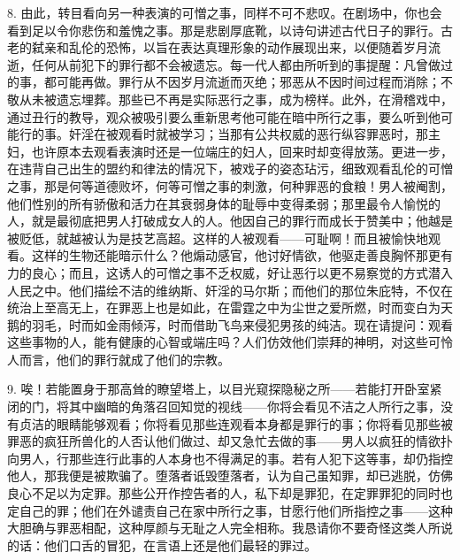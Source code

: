 8. 由此，转目看向另一种表演的可憎之事，同样不可不悲叹。在剧场中，你也会看到足以令你悲伤和羞愧之事。那是悲剧厚底靴，以诗句讲述古代日子的罪行。古老的弑亲和乱伦的恐怖，以旨在表达真理形象的动作展现出来，以便随着岁月流逝，任何从前犯下的罪行都不会被遗忘。每一代人都由所听到的事提醒：凡曾做过的事，都可能再做。罪行从不因岁月流逝而灭绝；邪恶从不因时间过程而消除；不敬从未被遗忘埋葬。那些已不再是实际恶行之事，成为榜样。此外，在滑稽戏中，通过丑行的教导，观众被吸引要么重新思考他可能在暗中所行之事，要么听到他可能行的事。奸淫在被观看时就被学习；当那有公共权威的恶行纵容罪恶时，那主妇，也许原本去观看表演时还是一位端庄的妇人，回来时却变得放荡。更进一步，在违背自己出生的盟约和律法的情况下，被戏子的姿态玷污，细致观看乱伦的可憎之事，那是何等道德败坏，何等可憎之事的刺激，何种罪恶的食粮！男人被阉割，他们性别的所有骄傲和活力在其衰弱身体的耻辱中变得柔弱；那里最令人愉悦的人，就是最彻底把男人打破成女人的人。他因自己的罪行而成长于赞美中；他越是被贬低，就越被认为是技艺高超。这样的人被观看——可耻啊！而且被愉快地观看。这样的生物还能暗示什么？他煽动感官，他讨好情欲，他驱走善良胸怀那更有力的良心；而且，这诱人的可憎之事不乏权威，好让恶行以更不易察觉的方式潜入人民之中。他们描绘不洁的维纳斯、奸淫的马尔斯；而他们的那位朱庇特，不仅在统治上至高无上，在罪恶上也是如此，在雷霆之中为尘世之爱所燃，时而变白为天鹅的羽毛，时而如金雨倾泻，时而借助飞鸟来侵犯男孩的纯洁。现在请提问：观看这些事物的人，能有健康的心智或端庄吗？人们仿效他们崇拜的神明，对这些可怜人而言，他们的罪行就成了他们的宗教。\par

9. 唉！若能置身于那高耸的瞭望塔上，以目光窥探隐秘之所——若能打开卧室紧闭的门，将其中幽暗的角落召回知觉的视线——你将会看见不洁之人所行之事，没有贞洁的眼睛能够观看；你将看见那些连观看本身都是罪行的事；你将看见那些被罪恶的疯狂所兽化的人否认他们做过、却又急忙去做的事——男人以疯狂的情欲扑向男人，行那些连行此事的人本身也不得满足的事。若有人犯下这等事，却仍指控他人，那我便是被欺骗了。堕落者诋毁堕落者，认为自己虽知罪，却已逃脱，仿佛良心不足以为定罪。那些公开作控告者的人，私下却是罪犯，在定罪罪犯的同时也定自己的罪；他们在外谴责自己在家中所行之事，甘愿行他们所指控之事——这种大胆确与罪恶相配，这种厚颜与无耻之人完全相称。我恳请你不要奇怪这类人所说的话：他们口舌的冒犯，在言语上还是他们最轻的罪过。\par

